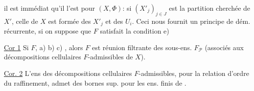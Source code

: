 il est immédiat qu'il l'est pour $(X,\Phi)$: si $(X'_j)_{j\in J}$ est la partition cherchée de $X'$, celle de $X$ est formée des $X'_j$ et des $U_i$. Ceci nous fournit un principe de dém. récurrente, si on suppose que $F$ satisfait la condition e)


\uline{Cor 1} Si $F$,  a) b) c) , alors $F$ est réunion filtrante des sous-ens.  $F_{\mathcal P}$ (associés aux décompositions cellulaires  $F$-admissibles de $X$).

\uline{Cor. 2} L'ens  des décompositions cellulaires $F$-admissibles, pour la relation d'ordre du raffinement, admet des bornes sup. pour les  ens. finis de .
